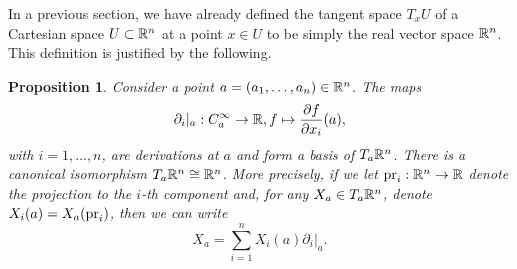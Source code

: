 \documentclass[11pt,a4paper]{book}
\newtheorem{prop}[thm]{Proposition}
\theoremstyle{remark} \newtheorem{rmk}[thm]{Remark}
\theoremstyle{definition} \newtheorem{defn}[thm]{Definition}
\theoremstyle{definition} \newtheorem{ex}[thm]{Example}
\theoremstyle{definition} \newtheorem{ej}[thm]{Exercise}
\begin{document}
In a previous section, we have already defined the tangent space $T_xU$ of a Cartesian space $U\subset \mathbb R^n$ at a point $x\in U$ to be simply the real vector space $\mathbb R^n$. This definition is justified by the following.

\begin{prop}
  Consider a point $a=(a_1,\dots,a_n)\in \mathbb R^n$. The maps
  \begin{equation*}
\partial_i|_a:C^\infty_a \rightarrow \mathbb R, f\mapsto \frac{\partial f}{\partial x_i} (a),
  \end{equation*}
  with $i=1,\dots,n$, are derivations at $a$ and form a basis of $T_a \mathbb R^n$. There is a canonical isomorphism $T_a \mathbb R^n \cong \mathbb R^n$.
  More precisely, if we let $\operatorname{pr}_i:\mathbb R^n \rightarrow \mathbb R$ denote the projection to the $i$-th component and, for any $X_a\in T_a \mathbb R^n$, denote $X_i(a)=X_a(\operatorname{pr}_i)$, then we can write
  \begin{equation*}
X_a=\sum_{i=1}^n X_i(a) \partial_i|_a.
  \end{equation*}
\end{prop}
\end{document}
